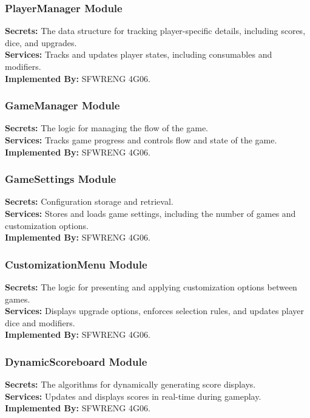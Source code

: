 \documentclass[12pt, titlepage]{article}
\begin{document}
\subsubsection{PlayerManager Module}
\textbf{Secrets:} The data structure for tracking player-specific details, including scores, dice, and upgrades.\\
\textbf{Services:} Tracks and updates player states, including consumables and modifiers.\\
\textbf{Implemented By:} SFWRENG 4G06.

\subsubsection{GameManager Module}
\textbf{Secrets:} The logic for managing the flow of the game.\\
\textbf{Services:} Tracks game progress and controls flow and state of the game.\\
\textbf{Implemented By:} SFWRENG 4G06.

\subsubsection{GameSettings Module}
\textbf{Secrets:} Configuration storage and retrieval.\\
\textbf{Services:} Stores and loads game settings, including the number of games and customization options.\\
\textbf{Implemented By:} SFWRENG 4G06.

\subsubsection{CustomizationMenu Module}
\textbf{Secrets:} The logic for presenting and applying customization options between games.\\
\textbf{Services:} Displays upgrade options, enforces selection rules, and updates player dice and modifiers.\\
\textbf{Implemented By:} SFWRENG 4G06.

\subsubsection{DynamicScoreboard Module}
\textbf{Secrets:} The algorithms for dynamically generating score displays.\\
\textbf{Services:} Updates and displays scores in real-time during gameplay.\\
\textbf{Implemented By:} SFWRENG 4G06.
\end{document}
